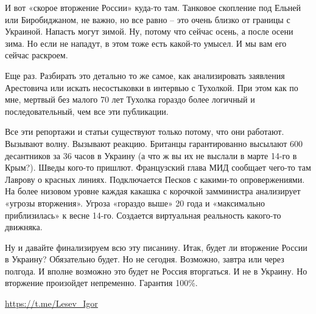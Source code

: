 И вот «скорое вторжение России» куда-то там. Танковое скопление под Ельней или
Биробиджаном, не важно, но все равно – это очень близко от границы с Украиной.
Напасть могут зимой. Ну, потому что сейчас осень, а после осени зима. Но если
не нападут, в этом тоже есть какой-то умысел. И мы вам его сейчас раскроем.

Еще раз. Разбирать это детально то же самое, как анализировать заявления
Арестовича или искать несостыковки в интервью с Тухолкой. При этом как по мне,
мертвый без малого 70 лет Тухолка гораздо более логичный и последовательный,
чем все эти публикации.

Все эти репортажи и статьи существуют только потому, что они работают. Вызывают
волну. Вызывают реакцию. Британцы гарантированно высылают 600 десантников за 36
часов в Украину (а что ж вы их не выслали в марте 14-го в Крым?). Шведы кого-то
пришлют. Французский глава МИД сообщает чего-то там Лаврову о красных линиях.
Подключается Песков с какими-то опровержениями. На более низовом уровне каждая
какашка с корочкой замминистра анализирует «угрозы вторжения». Угроза «гораздо
выше» 20 года и «максимально приблизилась» к весне 14-го. Создается виртуальная
реальность какого-то движняка.

Ну и давайте финализируем всю эту писанину. Итак, будет ли вторжение России в
Украину? Обязательно будет. Но не сегодня. Возможно, завтра или через полгода.
И вполне возможно это будет не Россия вторгаться. И не в Украину. Но вторжение
произойдет непременно. Гарантия 100\%.

\url{https://t.me/Lesev_Igor}

